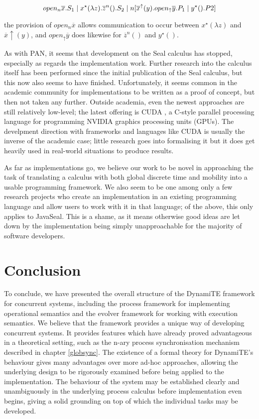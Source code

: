 \begin{equation}
  open_n \overline{x}.S_1 \;|\; x^\star(\lambda z).\overline{z}^n().S_2 \;|\; 
  n[\overline{x}^\uparrow(y).open_\uparrow \overline{y}.P_1 \;|\; y^\star ().P2]
\end{equation}

\noindent the provision of $open_n \overline{x}$ allows communication
to occur between $x^\star(\lambda z)$ and $\overline{x}\uparrow(y)$,
and $open_\uparrow \overline{y}$ does likewise for $\overline{z}^n()$
and $y^\star ()$.

  As with PAN, it seems that development on the Seal calculus has
  stopped, especially as regards the implementation work.  Further
  research into the calculus itself has been performed
  \cite{seal01,seal02} since the initial publication of the Seal
  calculus, but this now also seems to have finished.  Unfortunately,
  it seems common in the academic community for implementations to be
  written as a proof of concept, but then not taken any further.
  Outside academia, even the newest approaches are still relatively
  low-level; the latest offering is CUDA \cite{cuda}, a C-style
  parallel processing language for programming NVIDIA graphics
  processing units (GPUs).  The develpment direction with frameworks
  and languages like CUDA is usually the inverse of the academic case;
  little research goes into formalising it but it does get heavily
  used in real-world situations to produce results.

As far as implementations go, we believe our work to be novel in
approaching the task of translating a calculus with both global
discrete time and mobility into a usable programming framework.  We
also seem to be one among only a few research projects who create an
implementation in an existing programming language and allow users to
work with it in that language; of the above, this only applies to
JavaSeal.  This is a shame, as it means otherwise good ideas are let
down by the implementation being simply unapproachable for the
majority of software developers.

\section{Conclusion}

To conclude, we have presented the overall structure of the DynamiTE
framework for concurrent systems, including the process framework for
implementing operational semantics and the evolver framework for
working with execution semantics.  We believe that the framework
provides a unique way of developing concurrent systems.  It provides
features which have already proved advantageous in a theoretical
setting, such as the n-ary process synchronisation mechanism described
in chapter \ref{globsync}.  The existence of a formal theory for
DynamiTE's behaviour gives many advantages over more ad-hoc
approaches, allowing the underlying design to be rigorously examined
before being applied to the implementation.  The behaviour of the
system may be established clearly and unambiguously in the underlying
process calculus before implementation even begins, giving a solid
grounding on top of which the individual tasks may be developed.

